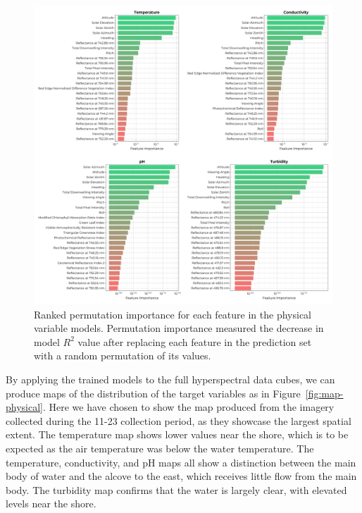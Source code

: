 \documentclass[remotesensing,article,submit,pdftex,moreauthors]{Definitions/mdpi}
\begin{document}
\begin{figure}[t!]
\centering
\vspace{-0.2in}
\includegraphics[width=\columnwidth]{paper/figures/results/fits/physical-ranking.pdf}
\caption{Ranked permutation importance for each feature in the physical variable models. Permutation importance measured the decrease in model $R^2$ value after replacing each feature in the prediction set with a random permutation of its values.\label{fig:physical-fi}}
\end{figure}  

By applying the trained models to the full hyperspectral data cubes, we can produce maps of the distribution of the target variables as in Figure~\ref{fig:map-physical}. Here we have chosen to show the map produced from the imagery collected during the 11-23 collection period, as they showcase the largest spatial extent. The temperature map shows lower values near the shore, which is to be expected as the air temperature was below the water temperature. The temperature, conductivity, and pH maps all show a distinction between the main body of water and the alcove to the east, which receives little flow from the main body. The turbidity map confirms that the water is largely clear, with elevated levels near the shore.
\end{document}
